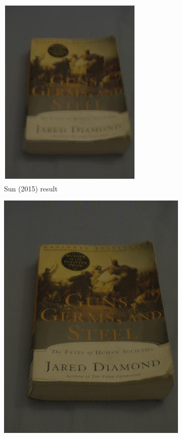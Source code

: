 \documentclass[10pt,twocolumn,letterpaper]{article}
\begin{document}
\begin{figure} [t]
\begin{center}
\begin{subfigure}{0.33\textwidth}
\includegraphics[width=0.9\linewidth]{book_deblurred}
\caption{Sun \etal (2015) result}
\label{fig:subim2}
\end{subfigure}
\begin{subfigure}{0.33\textwidth}
\graphicspath{ {deblurwhyte/} }
\includegraphics[width=0.9\linewidth]{book_whyte}

\end{subfigure}
\end{center}
\end{figure}
\end{document}
